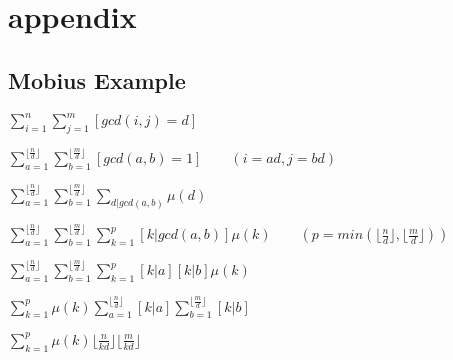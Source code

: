 \appendix


\chapter{appendix}

\section{Mobius Example}
  $ \displaystyle\sum_{i=1}^n \sum_{j=1}^m [gcd(i, j) = d] $

  $ \displaystyle\sum_{a=1}^{\lfloor \frac n d \rfloor} \sum_{b=1}^{\lfloor \frac m d \rfloor} [gcd(a, b) = 1] \qquad (i = ad, j = bd) $

  $ \displaystyle\sum_{a=1}^{\lfloor \frac n d \rfloor} \sum_{b=1}^{\lfloor \frac m d \rfloor} \sum_{d|gcd(a, b)} \mu (d) $

  $ \displaystyle\sum_{a=1}^{\lfloor \frac n d \rfloor} \sum_{b=1}^{\lfloor \frac m d \rfloor} \sum_{k=1}^p [k|gcd(a, b)] \mu (k) \qquad (p = min(\lfloor \frac n d \rfloor, \lfloor \frac m d \rfloor)) $

  $ \displaystyle\sum_{a=1}^{\lfloor \frac n d \rfloor} \sum_{b=1}^{\lfloor \frac m d \rfloor} \sum_{k=1}^p [k|a][k|b] \mu (k) $

  $ \displaystyle\sum_{k=1}^p \mu (k) \sum_{a=1}^{\lfloor \frac n d \rfloor} [k|a] \sum_{b=1}^{\lfloor \frac m d \rfloor} [k|b] $

  $ \displaystyle\sum_{k=1}^p \mu (k) \lfloor \frac n {kd} \rfloor \lfloor \frac m {kd} \rfloor $

